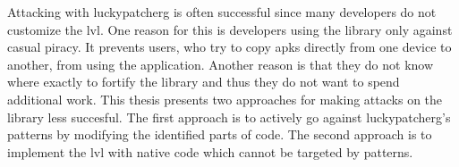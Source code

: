Attacking with \gls{luckypatcherg} is often successful since many developers do not customize the \gls{lvl}.
One reason for this is developers using the library only against casual piracy.
It prevents users, who try to copy \gls{apk}s directly from one device to another, from using the application.
Another reason is that they do not know where exactly to fortify the library and thus they do not want to spend additional work. \cite{developersSecuring} \cite{munteanLicense}
This thesis presents two approaches for making attacks on the library less succesful.
\newline
The first approach is to actively go against \gls{luckypatcherg}'s patterns by modifying the identified parts of code.
\newline
The second approach is to implement the \gls{lvl} with native code which cannot be targeted by patterns.

